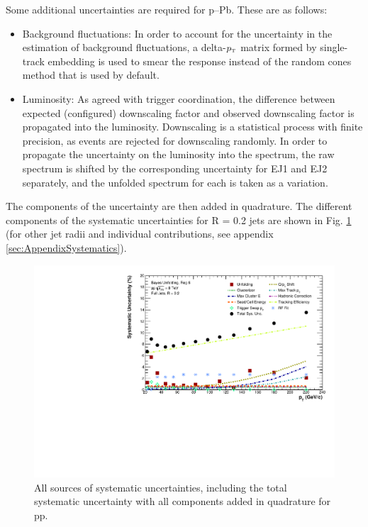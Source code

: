 \documentclass[ALICE]{ALICE_analysis_notes}
\newcommand{\pT}{$p_{\mbox{\tiny T}}$\xspace}
\newcommand{\pPb}{{\mbox{p--Pb}}\xspace}
\newcommand{\pp}{pp\xspace}
\begin{document}
Some additional uncertainties are required for \pPb. These are as follows:

\begin{itemize}
    \item Background fluctuations: In order to account for the uncertainty in the estimation of background fluctuations, a delta-\pT matrix formed by single-track embedding is used to smear the response instead of the random cones method that is used by default.
    \item Luminosity: As agreed with trigger coordination, the difference between expected (configured) downscaling factor and observed downscaling factor is propagated into the luminosity. Downscaling is a statistical process with finite precision, as events are rejected for downscaling randomly. In order to propagate the uncertainty on the luminosity into the spectrum, the raw spectrum is shifted by the corresponding uncertainty for EJ1 and EJ2 separately, and the unfolded spectrum for each is taken as a variation.
\end{itemize}

The components of the uncertainty are then added in quadrature. The different components of the systematic uncertainties for R = 0.2 jets are shown in Fig. \ref{fig:SystematicsSpectraR02} (for other jet radii and individual contributions, see appendix \ref{sec:AppendixSystematics}).

\begin{figure}
    \centering
    \includegraphics[width=15cm]{figures/Systematics/TotalSystematics_R02.pdf}
    \caption{All sources of systematic uncertainties, including the total systematic uncertainty with all components added in quadrature for \pp.}
    \label{fig:SystematicsSpectraR02}
\end{figure}
\end{document}
